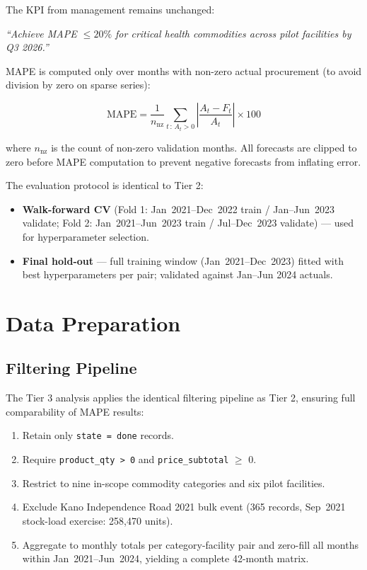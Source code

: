 \documentclass[12pt, a4paper]{article}
\begin{document}
The KPI from management remains unchanged:

\begin{mdframed}[style=keybox]
\textit{``Achieve MAPE $\leq 20\%$ for critical health commodities across
pilot facilities by Q3 2026.''}
\end{mdframed}

\vspace{0.5em}

MAPE is computed only over months with non-zero actual procurement
(to avoid division by zero on sparse series):

\[
  \text{MAPE} = \frac{1}{n_{\text{nz}}} \sum_{t\,:\,A_t>0}
  \left| \frac{A_t - F_t}{A_t} \right| \times 100
\]

where $n_{\text{nz}}$ is the count of non-zero validation months.
All forecasts are clipped to zero before MAPE computation to prevent
negative forecasts from inflating error.

The evaluation protocol is identical to Tier 2:
\begin{itemize}[leftmargin=1.5em, itemsep=3pt]
  \item \textbf{Walk-forward CV} (Fold 1: Jan~2021--Dec~2022 train /
        Jan--Jun~2023 validate; Fold 2: Jan~2021--Jun~2023 train /
        Jul--Dec~2023 validate) --- used for hyperparameter selection.
  \item \textbf{Final hold-out} --- full training window (Jan~2021--Dec~2023)
        fitted with best hyperparameters per pair; validated against
        Jan--Jun 2024 actuals.
\end{itemize}

\section{Data Preparation}

\subsection{Filtering Pipeline}

The Tier 3 analysis applies the identical filtering pipeline as Tier 2,
ensuring full comparability of MAPE results:

\begin{enumerate}[leftmargin=1.5em, itemsep=3pt]
  \item Retain only \texttt{state = done} records.
  \item Require \texttt{product\_qty > 0} and \texttt{price\_subtotal} $\geq$ 0.
  \item Restrict to nine in-scope commodity categories and six pilot
        facilities.
  \item Exclude Kano Independence Road 2021 bulk event (365 records,
        Sep~2021 stock-load exercise: 258,470 units).
  \item Aggregate to monthly totals per category-facility pair and
        zero-fill all months within Jan~2021--Jun~2024, yielding a
        complete 42-month matrix.
\end{enumerate}
\end{document}
